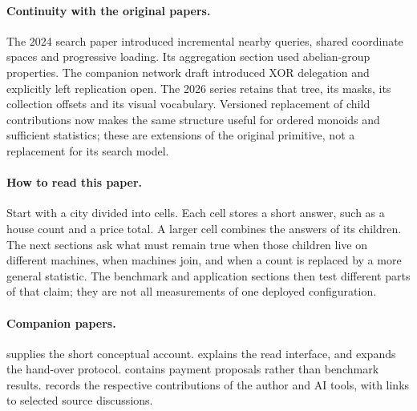 \documentclass[11pt]{article}
\begin{document}
\paragraph{Continuity with the original papers.}
The 2024 search paper introduced incremental nearby queries, shared coordinate spaces and progressive loading. Its aggregation section used abelian-group properties. The companion network draft introduced XOR delegation and explicitly left replication open. The 2026 series retains that tree, its masks, its collection offsets and its visual vocabulary. Versioned replacement of child contributions now makes the same structure useful for ordered monoids and sufficient statistics; these are extensions of the original primitive, not a replacement for its search model.

\paragraph{How to read this paper.}
Start with a city divided into cells. Each cell stores a short answer, such as a house count and a price total. A larger cell combines the answers of its children. The next sections ask what must remain true when those children live on different machines, when machines join, and when a count is replaced by a more general statistic. The benchmark and application sections then test different parts of that claim; they are not all measurements of one deployed configuration.

\paragraph{Companion papers.}
 supplies the short conceptual account.
 explains the read interface, and
 expands the hand-over protocol.
 contains payment proposals rather than benchmark results.
 records the respective contributions
of the author and AI tools, with links to selected source discussions.
\end{document}
